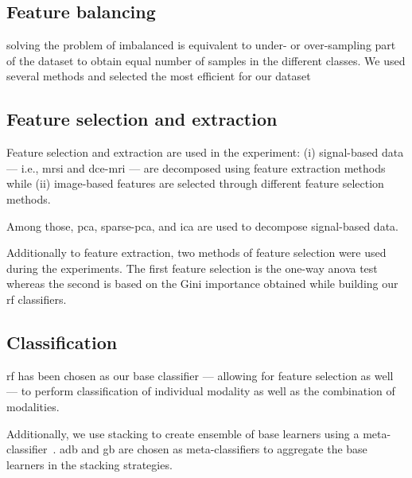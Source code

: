 \subsection{Feature balancing}\label{subsec:chp6:method:fea-bal}
 solving the problem of imbalanced is equivalent to under- or over-sampling part of the dataset to obtain equal number of samples in the different classes.
We used several methods and selected the most efficient for our dataset ~\cite{Lemaitre2016thesis}


\subsection{Feature selection and extraction}\label{subsec:chp6:method:fea-sel}

Feature selection and extraction are used in the experiment: (i) signal-based data --- i.e., \ac{mrsi} and \ac{dce}-\ac{mri} --- are decomposed using feature extraction methods while (ii) image-based features are selected through different feature selection methods.

Among those, \ac{pca}, sparse-\ac{pca}, and \ac{ica} are used to decompose signal-based data.

Additionally to feature extraction, two methods of feature selection were used during the experiments.
The first feature selection is the one-way \ac{anova} test whereas the second is based on the Gini importance obtained while building our \ac{rf} classifiers.

\subsection{Classification}\label{subsec:chp6:method:clas}

\ac{rf} has been chosen as our base classifier --- allowing for feature selection as well --- to perform classification of individual modality as well as the combination of modalities.


Additionally, we use stacking to create ensemble of base learners using a meta-classifier~\cite{wolpert1992stacked}.
\ac{adb} and \ac{gb} are chosen as meta-classifiers to aggregate the base learners in the stacking strategies.

